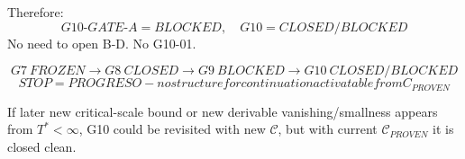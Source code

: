 \documentclass[11pt]{article}
\begin{document}
Therefore:
\[
\boxed{G10\text{-}GATE\text{-}A = BLOCKED},\quad \boxed{G10=CLOSED/BLOCKED}
\]
No need to open B-D. No G10-01.

\[
\boxed{G7\ FROZEN\to G8\ CLOSED\to G9\ BLOCKED\to G10\ CLOSED/BLOCKED}
\]
\[
\boxed{STOP=PROGRESO - no structure for continuation activatable from C_{PROVEN}}
\]

If later new critical-scale bound or new derivable vanishing/smallness appears from $T^*<\infty$, G10 could be revisited with new $\mathcal C$, but with current $\mathcal C_{PROVEN}$ it is closed clean.
\end{document}
